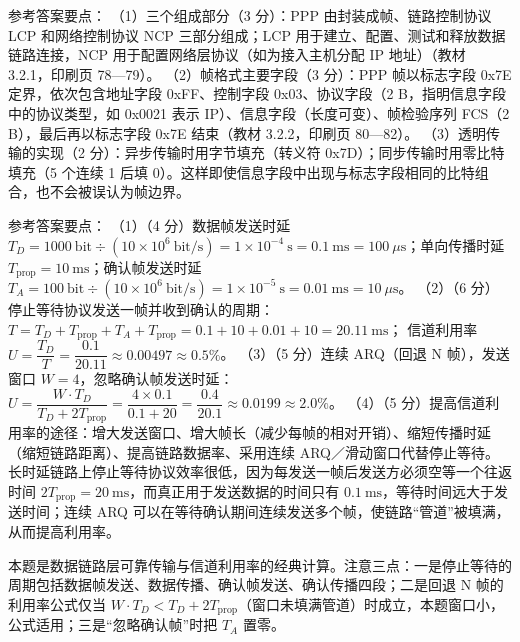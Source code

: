 \documentclass[a4paper,11pt]{article}
\begin{document}
\q 参考答案要点：
（1）三个组成部分（3 分）：PPP 由封装成帧、链路控制协议 LCP 和网络控制协议 NCP 三部分组成；LCP 用于建立、配置、测试和释放数据链路连接，NCP 用于配置网络层协议（如为接入主机分配 IP 地址）（教材 3.2.1，印刷页 78—79）。
（2）帧格式主要字段（3 分）：PPP 帧以标志字段 0x7E 定界，依次包含地址字段 0xFF、控制字段 0x03、协议字段（2 B，指明信息字段中的协议类型，如 0x0021 表示 IP）、信息字段（长度可变）、帧检验序列 FCS（2 B），最后再以标志字段 0x7E 结束（教材 3.2.2，印刷页 80—82）。
（3）透明传输的实现（2 分）：异步传输时用字节填充（转义符 0x7D）；同步传输时用零比特填充（5 个连续 1 后填 0）。这样即使信息字段中出现与标志字段相同的比特组合，也不会被误认为帧边界。


\q 参考答案要点：
（1）（4 分）数据帧发送时延 $T_D=1000\ \text{bit}\div(10\times10^{6}\ \text{bit/s})=1\times10^{-4}\ \text{s}=0.1\ \text{ms}=100\ \mu\text{s}$；单向传播时延 $T_{\text{prop}}=10\ \text{ms}$；确认帧发送时延 $T_A=100\ \text{bit}\div(10\times10^{6}\ \text{bit/s})=1\times10^{-5}\ \text{s}=0.01\ \text{ms}=10\ \mu\text{s}$。
（2）（6 分）停止等待协议发送一帧并收到确认的周期：
$T=T_D+T_{\text{prop}}+T_A+T_{\text{prop}}=0.1+10+0.01+10=20.11\ \text{ms}$；
信道利用率 $U=\dfrac{T_D}{T}=\dfrac{0.1}{20.11}\approx0.00497\approx0.5\%$。
（3）（5 分）连续 ARQ（回退 N 帧），发送窗口 $W=4$，忽略确认帧发送时延：
$U=\dfrac{W\cdot T_D}{T_D+2T_{\text{prop}}}=\dfrac{4\times0.1}{0.1+20}=\dfrac{0.4}{20.1}\approx0.0199\approx2.0\%$。
（4）（5 分）提高信道利用率的途径：增大发送窗口、增大帧长（减少每帧的相对开销）、缩短传播时延（缩短链路距离）、提高链路数据率、采用连续 ARQ／滑动窗口代替停止等待。长时延链路上停止等待协议效率很低，因为每发送一帧后发送方必须空等一个往返时间 $2T_{\text{prop}}=20\ \text{ms}$，而真正用于发送数据的时间只有 $0.1\ \text{ms}$，等待时间远大于发送时间；连续 ARQ 可以在等待确认期间连续发送多个帧，使链路“管道”被填满，从而提高利用率。
\begin{analysis}本题是数据链路层可靠传输与信道利用率的经典计算。注意三点：一是停止等待的周期包括数据帧发送、数据传播、确认帧发送、确认传播四段；二是回退 N 帧的利用率公式仅当 $W\cdot T_D<T_D+2T_{\text{prop}}$（窗口未填满管道）时成立，本题窗口小，公式适用；三是“忽略确认帧”时把 $T_A$ 置零。\end{analysis}
\end{document}
